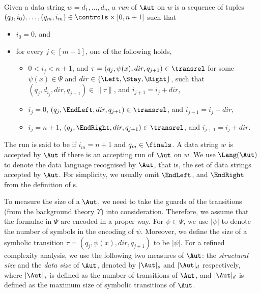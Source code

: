 Given a data string $w = d_1, \dots, d_n$, a \emph{run} of $\Aut$ on $w$
is a sequence of tuples $(q_0, i_0), \ldots, (q_m, i_m) \in \controls \times [0, n+1]$ 
such that
\begin{itemize}
    \item $i_0 = 0$, and
    \item for every $j \in [m-1]$, one of the following holds,
    \begin{itemize}
  	\item $0 < i_j < n+1$,  and $\tau=(q_j, \psi(x), dir, q_{j+1}) \in \transrel$ for some $\psi(x) \in \Psi$ and $dir \in \{\Left, \Stay, \Right\}$, such that $(q_j, d_{i_j}, dir, q_{j+1}) \in \|\tau\|$, and $i_{j+1} = i_j + dir$,
	\item $i_j = 0$, $(q_j, \EndLeft, dir, q_{j+1}) \in \transrel$, and $i_{j+1} = i_j + dir$,
	\item $i_j = n+1$, $(q_j, \EndRight, dir, q_{j+1}) \in \transrel$, and $i_{j+1} = i_j + dir$.
  \end{itemize}
\end{itemize}
The run is said to be  if $i_m = n+1$ and $q_m \in \finals$.
A data string $w$ is accepted by $\Aut$ if there is an accepting run of
$\Aut$ on $w$. We use $\Lang(\Aut)$ to denote the data language recognised by $\Aut$, that is,  the set of data strings accepted by $\Aut$.
%
For simplicity, we usually omit $\EndLeft$, and $\EndRight$ from the definition of \SSA{}s. 

To measure the size of a \SSA{} $\Aut$, we need to take the guards of the transitions (from the background theory $\Upsilon$) into  consideration. Therefore, we assume that the formulae in $\Psi$ are encoded in a proper way. %
For $\psi \in \Psi$, we use $|\psi|$ to denote the number of symbols in the encoding of $\psi$. Moreover, we define the size of a symbolic transition $\tau = (q_j, \psi(x), dir, q_{j+1})$ to be $|\psi|$.
For a refined complexity analysis, we use the following two measures of $\Aut$: %
the \emph{structural size} and the \emph{data size} of $\Aut$, denoted by $|\Aut|_s$ and $|\Aut|_d$ respectively, where $|\Aut|_s$ is defined as the number of transitions of $\Aut$, and $|\Aut|_d$ is defined as the maximum size of symbolic transitions of $\Aut$.


